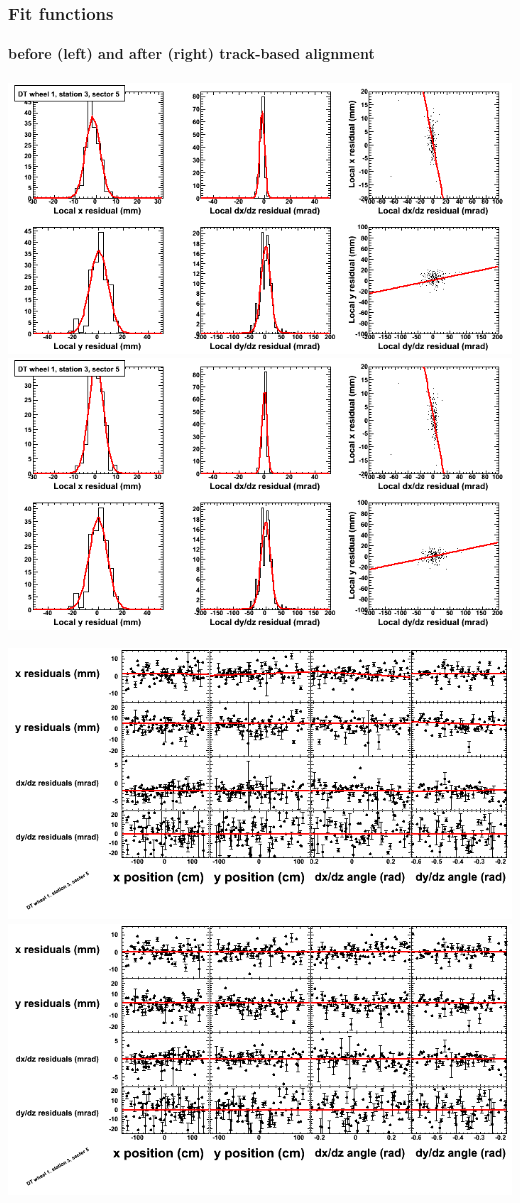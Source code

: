 \documentclass[compress]{beamer}
\begin{document}
\begin{frame}
\frametitle{Fit functions}
\framesubtitle{before (left) and after (right) track-based alignment}
\includegraphics[width=0.5\linewidth]{fitfunctions_re01/MBwhDst3sec05_bellcurves.png} \includegraphics[width=0.5\linewidth]{fitfunctions_re05/MBwhDst3sec05_bellcurves.png}

\includegraphics[width=0.5\linewidth]{fitfunctions_re01/MBwhDst3sec05_polynomials.png} \includegraphics[width=0.5\linewidth]{fitfunctions_re05/MBwhDst3sec05_polynomials.png}
\end{frame}
\end{document}
